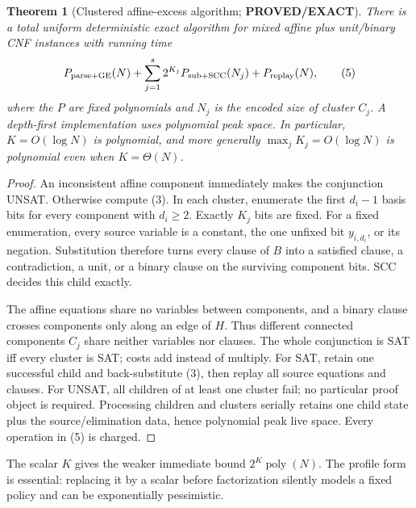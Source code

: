 \documentclass[11pt]{article}
\newtheorem{theorem}{Theorem}
\newcommand{\poly}{\operatorname{poly}}
\newcommand{\PROVED}{\textbf{PROVED/EXACT}}
\begin{document}
\begin{theorem}[Clustered affine-excess algorithm; \PROVED]\label{th:main}
There is a total uniform deterministic exact algorithm for mixed affine plus
unit/binary CNF instances with running time
\[
P_{\rm parse+GE}(N)+
\sum_{j=1}^{s}2^{K_j}P_{\rm sub+SCC}(N_j)+P_{\rm replay}(N),          \tag{5}
\]
where the $P$ are fixed polynomials and $N_j$ is the encoded size of cluster
$C_j$.  A depth-first implementation uses polynomial peak space.  In
particular, $K=O(\log N)$ is polynomial, and more generally
$\max_jK_j=O(\log N)$ is polynomial even when $K=\Theta(N)$.
\end{theorem}
\begin{proof}
An inconsistent affine component immediately makes the conjunction UNSAT.
Otherwise compute (3).  In each cluster, enumerate the first $d_i-1$ basis
bits for every component with $d_i\ge2$.  Exactly $K_j$ bits are fixed.
For a fixed enumeration, every source variable is a constant, the one
unfixed bit $y_{i,d_i}$, or its negation.  Substitution therefore turns every
clause of $B$ into a satisfied clause, a contradiction, a unit, or a binary
clause on the surviving component bits.  SCC decides this child exactly.

The affine equations share no variables between components, and a binary
clause crosses components only along an edge of $H$.  Thus different
connected components $C_j$ share neither variables nor clauses.  The whole
conjunction is SAT iff every cluster is SAT; costs add instead of multiply.
For SAT, retain one successful child and back-substitute (3), then replay all
source equations and clauses.  For UNSAT, all children of at least one
cluster fail; no particular proof object is required.  Processing children
and clusters serially retains one child state plus the source/elimination
data, hence polynomial peak live space.  Every operation in (5) is charged.
\end{proof}

The scalar $K$ gives the weaker immediate bound $2^K\poly(N)$.  The profile
form is essential: replacing it by a scalar before factorization silently
models a fixed policy and can be exponentially pessimistic.
\end{document}
